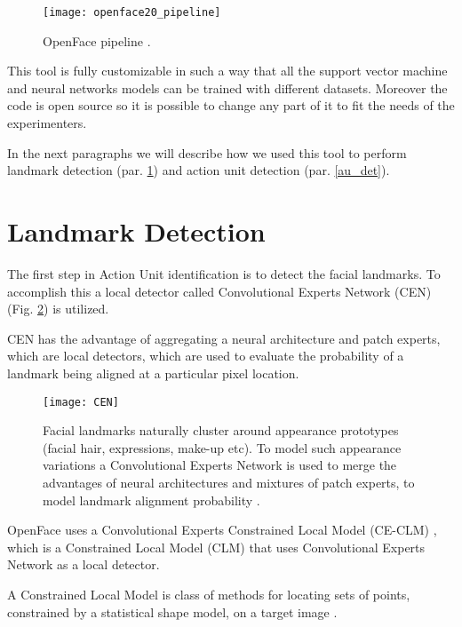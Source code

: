 \begin{figure}[H]
	\centering
	\texttt{[image: openface20\_pipeline]}
	\caption{OpenFace pipeline \cite{Baltru2018}.}
	\label{fig:openface20_pipeline}
\end{figure}

This tool is fully customizable in such a way that all the support vector machine and neural networks models can be trained with different datasets. Moreover the code is open source so it is possible to change any part of it to fit the needs of the experimenters.

In the next paragraphs we will describe how we used this tool to perform landmark detection (par. \ref{landmark_det}) and action unit detection (par. \ref{au_det}).


\clearpage

\section{Landmark Detection} \label{landmark_det}

The first step in Action Unit identification is to detect the facial landmarks. To accomplish this a local detector called Convolutional Experts Network (CEN) (Fig. \ref{fig:CEN}) is utilized. 


CEN has the advantage of aggregating a neural architecture and patch experts, which are local detectors, which are used to evaluate the probability of a landmark being aligned at a particular pixel location. 

\begin{figure}[H]
	\centering
	\texttt{[image: CEN]}
	\caption{Facial landmarks naturally cluster around appearance prototypes (facial hair, expressions, make-up etc). To model such appearance variations a Convolutional Experts Network is used to merge the advantages of neural architectures and mixtures of patch experts, to model landmark alignment probability \cite{Baltru2017}.}
	\label{fig:CEN}
\end{figure}

OpenFace uses a Convolutional Experts Constrained Local Model (CE-CLM) \cite{Baltru2017}, which is a Constrained Local Model (CLM) that uses Convolutional Experts Network as a local detector. 

A Constrained Local Model is class of methods for locating sets of points, constrained by a statistical shape model, on a target image \cite{clm_cootes}.

